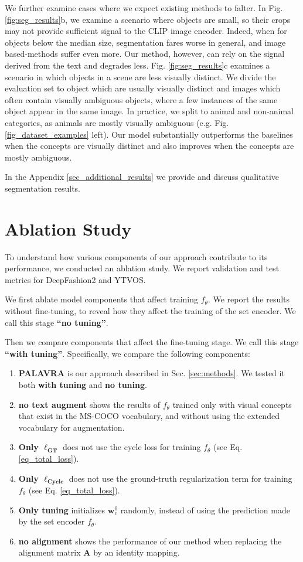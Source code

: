 \documentclass[runningheads]{llncs}
\newcommand{\secref}[1]{Sec. \ref{#1}}
\newcommand{\figref}[1]{Fig. \ref{#1}}
\renewcommand\vec[1]{\mathbf{#1}}
\newcommand{\ftheta}{f_\theta}
\newcommand{\A}{\vec{A}}
\newcommand{\w}{\vec{w}}
\begin{document}
We further examine cases where we expect existing methods to falter. In Fig. \ref{fig:seg_results}b, we examine a scenario where objects are small, so their crops may not provide sufficient signal to the CLIP image encoder. Indeed, when for objects below the median size, segmentation fares worse in general, and image based-methods suffer even more. Our method, however, can rely on the signal derived from the text and degrades less. 
Fig. \ref{fig:seg_results}c examines a scenario in which objects in a scene are less visually distinct. We divide the evaluation set to object which are usually visually distinct and images which often contain visually ambiguous objects, where a few instances of the same object appear in the same image. In practice, we split to animal and non-animal categories, as animals are mostly visually ambiguous (e.g. \figref{fig_dataset_examples} left).
Our model substantially outperforms the baselines when the concepts are visually distinct and also improves when the concepts are mostly ambiguous.

In the Appendix \ref{sec_additional_results} we provide and discuss qualitative segmentation results. 


\section{Ablation Study}
\label{sec_ablation_study}
To understand how various components of our approach contribute to its performance, we conducted an ablation study. We report validation and test metrics for DeepFashion2 and YTVOS.

We first ablate model components that affect training $\ftheta$. We report the results without fine-tuning, to reveal how they affect the training of the set encoder. We call this stage \textbf{``no tuning''}.

Then we compare components that affect the fine-tuning stage. We call this stage \textbf{``with tuning''}. Specifically, we compare the following components:
\begin{enumerate}
    \item \textbf{PALAVRA} is our approach described in \secref{sec:methods}. We tested it both \textbf{with tuning} and \textbf{no tuning}.
    \item \textbf{no text augment} shows the results of  $\ftheta$ trained only with visual concepts that exist in the MS-COCO vocabulary, and without using the extended vocabulary for augmentation.
    \item \textbf{Only $\mathbf{\ell_{GT}}$} does not use the cycle loss for training $\ftheta$ (see Eq. \ref{eq_total_loss}).
    \item \textbf{Only $\mathbf{\ell_{Cycle}}$} does not use the ground-truth regularization term for training $\ftheta$ (see Eq. \ref{eq_total_loss}).
    \item \textbf{Only tuning} initializes $\w^0_c$ randomly, instead of using the prediction made by the set encoder $\ftheta$.
    \item \textbf{no alignment} shows the performance of our method when replacing the alignment matrix $\A$ by an identity mapping.
\end{enumerate}
\end{document}
